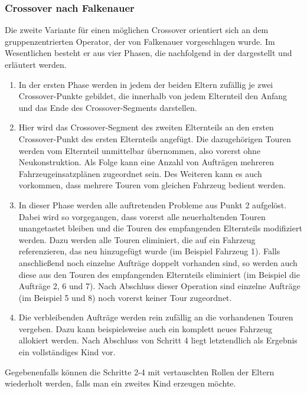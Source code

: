 \subsubsection{Crossover nach Falkenauer}
Die zweite Variante für einen möglichen Crossover orientiert sich an dem gruppenzentrierten Operator, der von Falkenauer vorgeschlagen wurde. Im Wesentlichen besteht er aus vier Phasen, die nachfolgend in der  dargestellt und erläutert werden.


\begin{enumerate}
 \item In der ersten Phase werden in jedem der beiden Eltern zufällig je zwei Crossover-Punkte gebildet, die innerhalb von jedem Elternteil den Anfang und das Ende des Crossover-Segments darstellen.
 \item Hier wird das Crossover-Segment des zweiten Elternteils an den ersten Crossover-Punkt des ersten Elternteils angefügt. Die dazugehörigen Touren werden vom Elternteil unmittelbar übernommen, also vorerst ohne Neukonstruktion. Als Folge kann eine Anzahl von Aufträgen mehreren Fahrzeugeinsatzplänen zugeordnet sein. Des Weiteren kann es auch vorkommen, dass mehrere Touren vom gleichen Fahrzeug bedient werden.
 \item In dieser Phase werden alle auftretenden Probleme aus Punkt 2 aufgelöst. Dabei wird so vorgegangen, dass vorerst alle neuerhaltenden Touren unangetastet bleiben und die Touren des empfangenden Elternteils modifiziert werden. Dazu werden alle Touren eliminiert, die auf ein Fahrzeug referenzieren, das neu hinzugefügt wurde (im Beispiel Fahrzeug 1). Falls anschließend noch einzelne Aufträge doppelt vorhanden sind, so werden auch diese aus den Touren des empfangenden Elternteils eliminiert (im Beispiel die Aufträge 2, 6 und 7). Nach Abschluss dieser Operation sind einzelne Aufträge (im Beispiel 5 und 8) noch vorerst keiner Tour zugeordnet.
 \item Die verbleibenden Aufträge werden rein zufällig an die vorhandenen Touren vergeben. Dazu kann beispielsweise auch ein komplett neues Fahrzeug allokiert werden. Nach Abschluss von Schritt 4 liegt letztendlich als Ergebnis ein vollständiges Kind vor.
\end{enumerate}

Gegebenenfalls können die Schritte 2-4 mit vertauschten Rollen der Eltern wiederholt werden, falls man ein zweites Kind erzeugen möchte.

